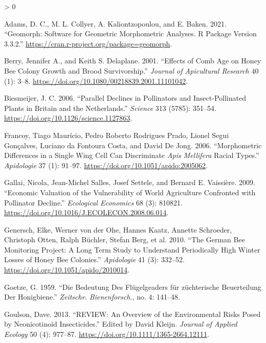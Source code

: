 \documentclass[
]{article}
\newlength{\cslhangindent}
\newenvironment{CSLReferences}[2] %
 {%
  \setlength{\parindent}{0pt}
  \ifodd #1 \everypar{\setlength{\hangindent}{\cslhangindent}}\ignorespaces\fi
  \ifnum #2 > 0
  \setlength{\parskip}{#2\baselineskip}
  \fi
 }%
 {}
\begin{document}
\hypertarget{refs}{}
\begin{CSLReferences}{1}{0}
\leavevmode\hypertarget{ref-geomorph2021a}{}%
Adams, D. C., M. L. Collyer, A. Kaliontzopoulou, and E. Baken. 2021. {``Geomorph: Software for Geometric Morphometric Analyses. R Package Version 3.3.2.''} \url{https://cran.r-project.org/package=geomorph}.

\leavevmode\hypertarget{ref-berry2001}{}%
Berry, Jennifer A., and Keith S. Delaplane. 2001. {``Effects of Comb Age on Honey Bee Colony Growth and Brood Survivorship.''} \emph{Journal of Apicultural Research} 40 (1): 3--8. \url{https://doi.org/10.1080/00218839.2001.11101042}.

\leavevmode\hypertarget{ref-biesmeijer2006}{}%
Biesmeijer, J. C. 2006. {``Parallel Declines in Pollinators and Insect-Pollinated Plants in Britain and the Netherlands.''} \emph{Science} 313 (5785): 351--54. \url{https://doi.org/10.1126/science.1127863}.

\leavevmode\hypertarget{ref-francoy2006}{}%
Francoy, Tiago Maurício, Pedro Roberto Rodrigues Prado, Lionel Segui Gonçalves, Luciano da Fontoura Costa, and David De Jong. 2006. {``Morphometric Differences in a Single Wing Cell Can Discriminate {\emph{Apis Mellifera}} Racial Types.''} \emph{Apidologie} 37 (1): 91--97. \url{https://doi.org/10.1051/apido:2005062}.

\leavevmode\hypertarget{ref-gallai2009}{}%
Gallai, Nicola, Jean-Michel Salles, Josef Settele, and Bernard E. Vaissière. 2009. {``Economic Valuation of the Vulnerability of World Agriculture Confronted with Pollinator Decline.''} \emph{Ecological Economics} 68 (3): 810821. \url{https://doi.org/10.1016/J.ECOLECON.2008.06.014}.

\leavevmode\hypertarget{ref-genersch2010}{}%
Genersch, Elke, Werner von der Ohe, Hannes Kaatz, Annette Schroeder, Christoph Otten, Ralph Büchler, Stefan Berg, et al. 2010. {``The German Bee Monitoring Project: A Long Term Study to Understand Periodically High Winter Losses of Honey Bee Colonies.''} \emph{Apidologie} 41 (3): 332--52. \url{https://doi.org/10.1051/apido/2010014}.

\leavevmode\hypertarget{ref-goetze1959}{}%
Goetze, G. 1959. {``Die Bedeutung Des Flügelgeaders für züchterische Beuerteilung Der Honigbiene.''} \emph{Zeitschr. Bienenforsch.}, no. 4: 141--48.

\leavevmode\hypertarget{ref-goulson2013}{}%
Goulson, Dave. 2013. {``REVIEW: An Overview of the Environmental Risks Posed by Neonicotinoid Insecticides.''} Edited by David Kleijn. \emph{Journal of Applied Ecology} 50 (4): 977--87. \url{https://doi.org/10.1111/1365-2664.12111}.


\end{CSLReferences}
\end{document}
